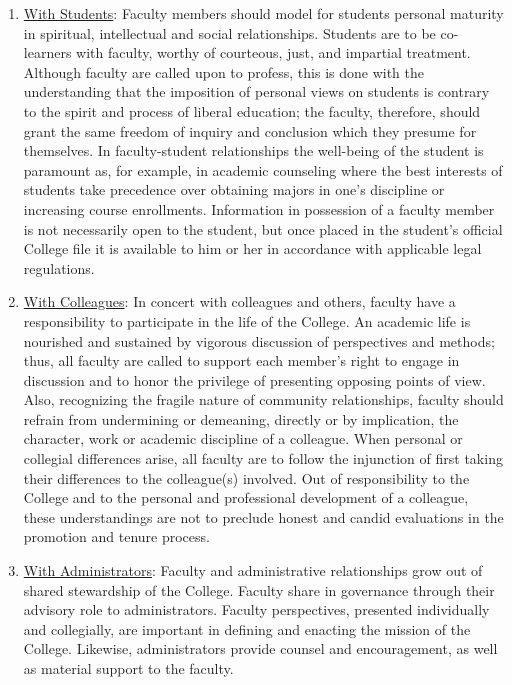 				\begin{enumerate}[label=\alph*)]
					\item{\underline{With Students}:  Faculty members should model for students personal maturity in spiritual, intellectual and social relationships.  Students are to be co-learners with faculty, worthy of courteous, just, and impartial treatment.  Although faculty are called upon to profess, this is done with the understanding that the imposition of personal views on students is contrary to the spirit and process of liberal education; the faculty, therefore, should grant the same freedom of inquiry and conclusion which they presume for themselves.  In faculty-student relationships the well-being of the student is paramount as, for example, in academic counseling where the best interests of students take precedence over obtaining majors in one's discipline or increasing course enrollments.  Information in possession of a faculty member is not necessarily open to the student, but once placed in the student's official College file it is available to him or her in accordance with applicable legal regulations.}
					\item{\underline{With Colleagues}:  In concert with colleagues and others, faculty have a responsibility to participate in the life of the College.  An academic life is nourished and sustained by vigorous discussion of perspectives and methods; thus, all faculty are called to support each member's right to engage in discussion and to honor the privilege of presenting opposing points of view.  Also, recognizing the fragile nature of community relationships, faculty should refrain from undermining or demeaning, directly or by implication, the character, work or academic discipline of a colleague. When personal or collegial differences arise, all faculty are to follow the injunction of first taking their differences to the colleague(s) involved.  Out of responsibility to the College and to the personal and professional development of a colleague, these understandings are not to preclude honest and candid evaluations in the promotion and tenure process.}
					\item{\underline{With Administrators}:  Faculty and administrative relationships grow out of shared stewardship of the College.  Faculty share in governance through their advisory role to administrators.  Faculty perspectives, presented individually and collegially, are important in defining and enacting the mission of the College.  Likewise, administrators provide counsel and encouragement, as well as material support to the faculty.}

\end{enumerate}
